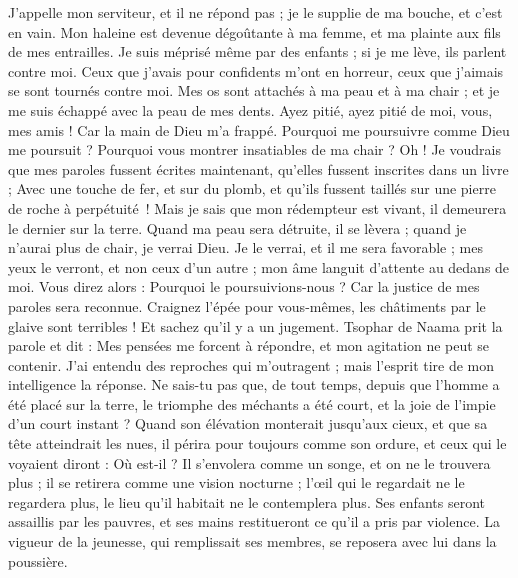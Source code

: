 \begin{multicols}{2}
J'appelle mon serviteur, et il ne répond pas ; je le supplie de ma bouche, et c'est en vain.
Mon haleine est devenue dégoûtante à ma femme, et ma plainte aux fils de mes entrailles.
Je suis méprisé même par des enfants ; si je me lève, ils parlent contre moi.
Ceux que j'avais pour confidents m'ont en horreur, ceux que j'aimais se sont tournés contre moi.
Mes os sont attachés à ma peau et à ma chair ; et je me suis échappé avec la peau de mes dents.
Ayez pitié, ayez pitié de moi, vous, mes amis ! Car la main de Dieu m'a frappé.
Pourquoi me poursuivre comme Dieu me poursuit ? Pourquoi vous montrer insatiables de ma chair ?
Oh ! Je voudrais que mes paroles fussent écrites maintenant, qu'elles fussent inscrites dans un livre ;
Avec une touche de fer, et sur du plomb, et qu’ils fussent taillés sur une pierre de roche à perpétuité !
Mais je sais que mon rédempteur est vivant, il demeurera le dernier sur la terre.
Quand ma peau sera détruite, il se lèvera ; quand je n'aurai plus de chair, je verrai Dieu.
Je le verrai, et il me sera favorable ; mes yeux le verront, et non ceux d'un autre ; mon âme languit d'attente au dedans de moi.
Vous direz alors : Pourquoi le poursuivions-nous ? Car la justice de mes paroles sera reconnue.
Craignez l'épée pour vous-mêmes, les châtiments par le glaive sont terribles ! Et sachez qu'il y a un jugement.
\VerseOne{}Tsophar de Naama prit la parole et dit :
Mes pensées me forcent à répondre, et mon agitation ne peut se contenir.
J'ai entendu des reproches qui m'outragent ; mais l'esprit tire de mon intelligence la réponse.
Ne sais-tu pas que, de tout temps, depuis que l'homme a été placé sur la terre,
le triomphe des méchants a été court, et la joie de l'impie d'un court instant ?
Quand son élévation monterait jusqu'aux cieux, et que sa tête atteindrait les nues,
il périra pour toujours comme son ordure, et ceux qui le voyaient diront : Où est-il ?
Il s'envolera comme un songe, et on ne le trouvera plus ; il se  retirera comme une vision nocturne ;
l'œil qui le regardait ne le regardera plus, le lieu qu'il habitait ne le contemplera plus.
Ses enfants seront assaillis par les pauvres, et ses mains restitueront ce qu'il a pris par violence.
La vigueur de la jeunesse, qui remplissait ses membres, se reposera avec lui dans la poussière.

\end{multicols}
